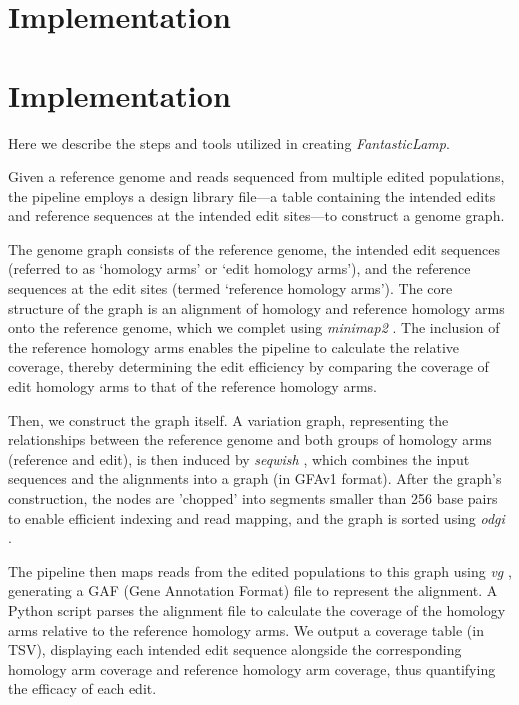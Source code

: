 \documentclass{bioinfo}
\theoremstyle{definition}
\begin{document}
\section*{Implementation}
\label{sec:implementation}
\section*{Implementation}
\label{sec:implementation}
Here we describe the steps and tools utilized in creating \textit{FantasticLamp}.

Given a reference genome and reads sequenced from multiple edited populations, the pipeline employs a design library file---a table containing the intended edits and reference sequences at the intended edit sites---to construct a genome graph.

The genome graph consists of the reference genome, the intended edit sequences (referred to as `homology arms' or `edit homology arms'), and the reference sequences at the edit sites (termed `reference homology arms').
The core structure of the graph is an alignment of homology and reference homology arms onto the reference genome, which we complet using \textit{minimap2} \citep{li2018minimap2}.
The inclusion of the reference homology arms enables the pipeline to calculate the relative coverage, thereby determining the edit efficiency by comparing the coverage of edit homology arms to that of the reference homology arms.

Then, we construct the graph itself.
A variation graph, representing the relationships between the reference genome and both groups of homology arms (reference and edit), is then induced by \textit{seqwish} \citep{garrison2023unbiased}, which combines the input sequences and the alignments into a graph (in GFAv1 format).
After the graph's construction, the nodes are 'chopped' into segments smaller than 256 base pairs to enable efficient indexing and read mapping, and the graph is sorted using \textit{odgi} \citep{guarracino2022odgi}.

The pipeline then maps reads from the edited populations to this graph using \textit{vg} \citep{garrison2018variation}, generating a GAF (Gene Annotation Format) file to represent the alignment.
A Python script parses the alignment file to calculate the coverage of the homology arms relative to the reference homology arms.
We output a coverage table (in TSV), displaying each intended edit sequence alongside the corresponding homology arm coverage and reference homology arm coverage, thus quantifying the efficacy of each edit.
\end{document}
